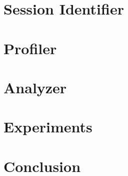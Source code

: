 \documentclass{vldb}
\begin{document}
\section{Session Identifier}
\label{sec:sessionidentifier}


\section{Profiler}
\label{sec:profiler}


\section{Analyzer}
\label{sec:analyzer}



%

%

%

%

\section{Experiments}
\label{sec:experiments}  %


\section{Conclusion}
\label{sec:conclusion}  %

\end{document}
